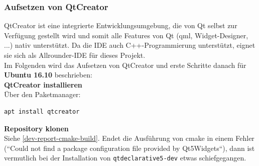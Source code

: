 \subsubsection{Aufsetzen von QtCreator}

QtCreator ist eine integrierte Entwicklungsumgebung, die von Qt selbst zur
Verfügung gestellt wird und somit alle Features von Qt (qml, Widget-Designer, ...)
nativ unterstützt. Da die IDE auch C++-Programmierung unterstützt, eignet sie
sich als Allrounder-IDE für dieses Projekt.\\

Im Folgenden wird das Aufsetzen von QtCreator und erste Schritte danach für
\textbf{Ubuntu 16.10} beschrieben:\\

\textbf{QtCreator installieren}\\
Über den Paketmanager:
\begin{lstlisting}
apt install qtcreator
\end{lstlisting}

\textbf{Repository klonen}\\
Siehe \autoref{dev-report-cmake-build}. Endet die Ausführung von cmake in einem
Fehler (``Could not find a package configuration file provided by Qt5Widgets``),
dann ist vermutlich bei der Installation von \texttt{qtdeclarative5-dev} etwas
schiefgegangen.\\

